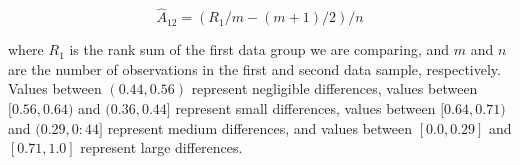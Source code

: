 \begin{equation}
	\hat{A}_{12} = (R_1/m - (m + 1)/2)/n 
\end{equation}

\noindent where $R_1$ is the rank sum of the first data group we are comparing, and $m$ and $n$ are the number of observations in the first and second data sample, respectively. Values between $(0.44, 0.56)$ represent negligible differences, values between $[0.56, 0.64)$ and $(0.36, 0.44]$ represent small differences, values between $[0.64, 0.71)$ and $(0.29, 0:44]$ represent medium differences, and values between $[0.0, 0.29]$ and $[0.71, 1.0]$ represent large differences.






